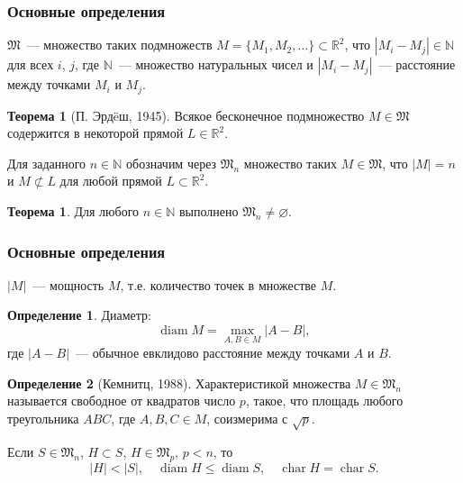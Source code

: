 \documentclass[10pt,pdf,hyperref={unicode}]{beamer}
\theoremstyle{definition}
\newtheorem{ttheorem}[llemma]{Теорема}
\newtheorem{ddefinition}{Определение}[llemma]
\begin{document}
\begin{frame}
	\frametitle{Основные определения}

	$\mathfrak{M}$~--- множество таких подмножеств
	$
		M = \{M_1, M_2, ... \}\subset \mathbb{R}^2
	$,
	что
	$
		|M_i - M_j|\in\mathbb{N}
	$
	для всех $i$, $j$, где $\mathbb{N}$~--- множество натуральных чисел
	и $|M_i - M_j|$~--- расстояние между точками $M_i$ и $M_j$.

	\begin{ttheorem}[П. Эрд\"{e}ш, 1945]
		\label{thmErdos}
		Всякое бесконечное подмножество $M\in\mathfrak{M}$
		содержится в некоторой прямой $L\in\mathbb{R}^2$.
	\end{ttheorem}

	\vspace{2em}

	Для заданного $n\in\mathbb{N}$ обозначим через $\mathfrak{M}_n$
	множество таких $M\in\mathfrak{M}$, что
	$|M|=n$ и $M \not\subset L$ для любой прямой $L \subset\mathbb{R}^2$.

	\begin{ttheorem}
		\label{thm:power_exist}
		Для любого $n\in\mathbb{N}$ выполнено $\mathfrak{M}_n\neq\varnothing$.
	\end{ttheorem}

\end{frame}


\begin{frame}
	\frametitle{Основные определения}

	$|M|$~--- мощность $M$, т.е. количество точек в множестве $M$.

	\begin{ddefinition}
		Диаметр:
		\begin{equation*}
			\operatorname{diam} M = \max_{A,B\in M} |A-B|
			,
		\end{equation*}
		где $|A-B|$~--- обычное евклидово расстояние между точками $A$ и $B$.
	\end{ddefinition}


	\begin{ddefinition}[Кемнитц, 1988]
		Характеристикой множества $M\in\mathfrak{M}_n$ называется свободное от квадратов
		число $p$, такое, что площадь любого треугольника $ABC$, где $A,B,C\in M$,
		соизмерима с $\sqrt{p}$.
	\end{ddefinition}

	\vspace{2em}

	Если $S\in\mathfrak{M}_n$, $H \subset S$, $H\in\mathfrak{M}_{p}$, $p<n$,
	то
	\begin{equation*}
		|H| < |S|, \quad \operatorname{diam} H \leq \operatorname{diam} S, \quad \operatorname{char} H = \operatorname{char} S
		.
	\end{equation*}

\end{frame}
\end{document}
